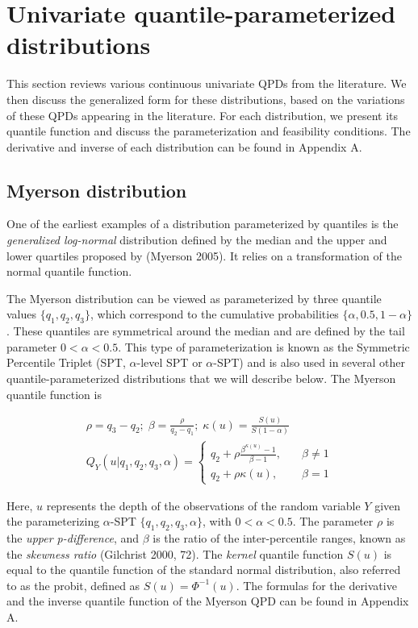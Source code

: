 \documentclass[
]{interact}
\begin{document}
\section{Univariate quantile-parameterized
distributions}\label{univariate-quantile-parameterized-distributions}

This section reviews various continuous univariate QPDs from the
literature. We then discuss the generalized form for these
distributions, based on the variations of these QPDs appearing in the
literature. For each distribution, we present its quantile function and
discuss the parameterization and feasibility conditions. The derivative
and inverse of each distribution can be found in Appendix A.

\subsection{Myerson distribution}\label{myerson-distribution}

One of the earliest examples of a distribution parameterized by
quantiles is the \emph{generalized log-normal} distribution defined by
the median and the upper and lower quartiles proposed by (Myerson 2005).
It relies on a transformation of the normal quantile function.

The Myerson distribution can be viewed as parameterized by three
quantile values \(\{q_1, q_2, q_3\}\), which correspond to the
cumulative probabilities \(\{\alpha, 0.5, 1-\alpha\}\). These quantiles
are symmetrical around the median and are defined by the tail parameter
\(0<\alpha<0.5\). This type of parameterization is known as the
Symmetric Percentile Triplet (SPT, \(\alpha\)-level SPT or
\(\alpha\)-SPT) and is also used in several other quantile-parameterized
distributions that we will describe below. The Myerson quantile function
is

\[
\begin{gathered}
\rho=q_3-q_2;\; 
\beta=\frac{\rho}{q_2-q_1};\;
\kappa(u)=\frac{S(u)}{S(1-\alpha)}\\
Q_Y(u \vert q_1,q_2,q_3,\alpha)=
\begin{cases}
q_2+\rho\frac{\beta^{\kappa(u)}-1}{\beta-1}, \quad &\beta \neq 1\\
q_2+\rho\kappa(u), \quad &\beta =1
\end{cases}
\end{gathered}
\]

Here, \(u\) represents the depth of the observations of the random
variable \(Y\) given the parameterizing \(\alpha\)-SPT
\(\{q_1, q_2, q_3, \alpha\}\), with \(0 < \alpha < 0.5\). The parameter
\(\rho\) is the \emph{upper p-difference}, and \(\beta\) is the ratio of
the inter-percentile ranges, known as the \emph{skewness ratio}
(Gilchrist 2000, 72). The \emph{kernel} quantile function \(S(u)\) is
equal to the quantile function of the standard normal distribution, also
referred to as the probit, defined as \(S(u) = \Phi^{-1}(u)\). The
formulas for the derivative and the inverse quantile function of the
Myerson QPD can be found in Appendix A.
\end{document}
